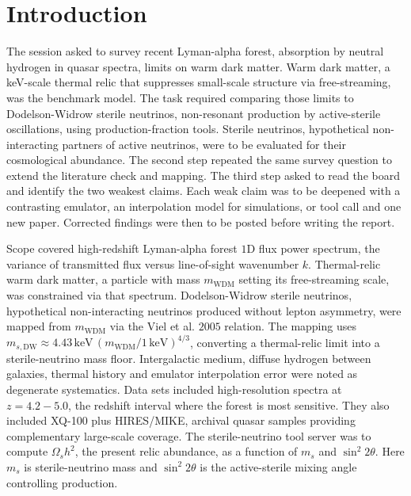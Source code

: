 \documentclass[11pt,a4paper]{article}
\begin{document}
\section{Introduction}
The session asked to survey recent Lyman-alpha forest, absorption by neutral hydrogen in quasar spectra, limits on warm dark matter. Warm dark matter, a keV-scale thermal relic that suppresses small-scale structure via free-streaming, was the benchmark model. The task required comparing those limits to Dodelson-Widrow sterile neutrinos, non-resonant production by active-sterile oscillations, using production-fraction tools. Sterile neutrinos, hypothetical non-interacting partners of active neutrinos, were to be evaluated for their cosmological abundance. The second step repeated the same survey question to extend the literature check and mapping. The third step asked to read the board and identify the two weakest claims. Each weak claim was to be deepened with a contrasting emulator, an interpolation model for simulations, or tool call and one new paper. Corrected findings were then to be posted before writing the report.

Scope covered high-redshift Lyman-alpha forest $1$D flux power spectrum, the variance of transmitted flux versus line-of-sight wavenumber $k$. Thermal-relic warm dark matter, a particle with mass $m_{\mathrm{WDM}}$ setting its free-streaming scale, was constrained via that spectrum. Dodelson-Widrow sterile neutrinos, hypothetical non-interacting neutrinos produced without lepton asymmetry, were mapped from $m_{\mathrm{WDM}}$ via the Viel et al. $2005$ relation. The mapping uses $m_{s,\mathrm{DW}} \approx 4.43\,\mathrm{keV}\,(m_{\mathrm{WDM}}/1\,\mathrm{keV})^{4/3}$, converting a thermal-relic limit into a sterile-neutrino mass floor. Intergalactic medium, diffuse hydrogen between galaxies, thermal history and emulator interpolation error were noted as degenerate systematics. Data sets included high-resolution spectra at $z = 4.2-5.0$, the redshift interval where the forest is most sensitive. They also included XQ-100 plus HIRES/MIKE, archival quasar samples providing complementary large-scale coverage. The sterile-neutrino tool server was to compute $\Omega_s h^2$, the present relic abundance, as a function of $m_s$ and $\sin^2 2\theta$. Here $m_s$ is sterile-neutrino mass and $\sin^2 2\theta$ is the active-sterile mixing angle controlling production.
\end{document}
